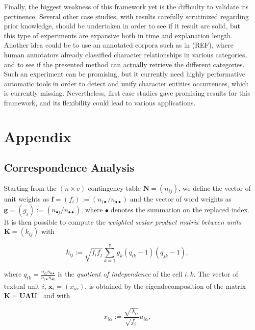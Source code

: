 \documentclass[
twocolumn,
]{ceurart}
\begin{document}
Finally, the biggest weakness of this framework yet is the difficulty to validate its pertinence. Several other case studies, with results carefully scrutinized regarding prior knowledge, should be undertaken in order to see if it result are solid, but this type of experiments are expansive both in time and explanation length. Another idea could be to use an annotated corpora such as in (REF), where human annotators already classified character relationships in various categories, and to see if the presented method can actually retrieve the different categories. Such an experiment can be promising, but it currently need highly performative automatic tools in order to detect and unify character entities occurrences, which is currently missing. Nevertheless, first case studies gave promising results for this framework, and its flexibility could lead to various applications.

\appendix

\section{Appendix}

\subsection{Correspondence Analysis}
\label{ca_details}

Starting from the $(n \times v)$ contingency table $\mathbf{N} = (n_{ij})$, we define the vector of unit weights as $\mathbf{f} = (f_i) := (n_{i\bullet}/n_{\bullet \bullet})$ and the vector of word weights as $\mathbf{g} = (g_j) := (n_{\bullet j}/n_{\bullet \bullet})$, where $\bullet$ denotes the summation on the replaced index. It is then possible to compute the \emph{weighted scalar product matrix between units} $\mathbf{K} = (k_{ij})$ with

\begin{equation}
k_{ij} := \sqrt{f_i f_j} \sum_{k=1}^{v} g_k(q_{ik} - 1)(q_{jk} - 1), 
\end{equation}

where $q_{ik} = \frac{n_{ik} n_{\bullet \bullet}}{n_{j \bullet} n_{\bullet k}}$ is the \emph{quotient of independence} of the cell $i, k$. The vector of textual unit $i$, $\mathbf{x}_i = (x_{i\alpha})$, is obtained by the eigendecomposition of the matrix $\mathbf{K} = \mathbf{U}\bm{\Lambda}\mathbf{U}^\top$ and with

\begin{equation}
x_{i\alpha} := \frac{\sqrt{\lambda_\alpha}}{\sqrt{f_i}} u_{i \alpha},
\end{equation}
\end{document}
